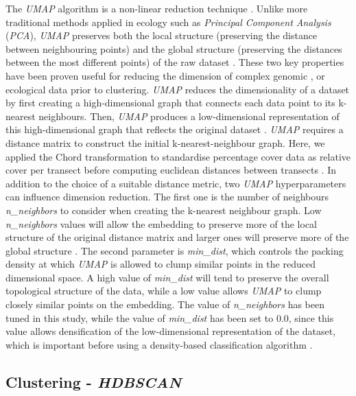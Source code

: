 \begin{refsection}
The \emph{UMAP} algorithm is a non-linear reduction technique
\autocite{McInnes_2020}. Unlike more traditional methods applied in
ecology such as \emph{Principal Component Analysis} (\emph{PCA}),
\emph{UMAP} preserves both the local structure (preserving the distance
between neighbouring points) and the global structure (preserving the
distances between the most different points) of the raw dataset
\autocite{McInnes_2020}. These two key properties have been proven
useful for reducing the dimension of complex genomic
\autocite{Dorrity_2020}, or ecological \autocite{Milosevic_2022} data
prior to clustering. \emph{UMAP} reduces the dimensionality of a dataset
by first creating a high-dimensional graph that connects each data point
to its k-nearest neighbours. Then, \emph{UMAP} produces a
low-dimensional representation of this high-dimensional graph that
reflects the original dataset \autocite{McInnes_2020}. \emph{UMAP}
requires a distance matrix to construct the initial k-nearest-neighbour
graph. Here, we applied the Chord transformation to standardise
percentage cover data as relative cover per transect before computing
euclidean distances between transects \autocite{Legendre_2001}. In
addition to the choice of a suitable distance metric, two \emph{UMAP}
hyperparameters can influence dimension reduction. The first one is the
number of neighbours \emph{n\_neighbors} to consider when creating the
k-nearest neighbour graph. Low \emph{n\_neighbors} values will allow the
embedding to preserve more of the local structure of the original
distance matrix and larger ones will preserve more of the global
structure \autocite{McInnes_2020}. The second parameter is
\emph{min\_dist}, which controls the packing density at which
\emph{UMAP} is allowed to clump similar points in the reduced
dimensional space. A high value of \emph{min\_dist} will tend to
preserve the overall topological structure of the data, while a low
value allows \emph{UMAP} to clump closely similar points on the
embedding. The value of \emph{n\_neighbors} has been tuned in this
study, while the value of \emph{min\_dist} has been set to 0.0, since
this value allows densification of the low-dimensional representation of
the dataset, which is important before using a density-based
classification algorithm \autocite{Vermeulen_2021}.

\hypertarget{clustering---hdbscan}{%
\subsection{\texorpdfstring{Clustering -
\emph{HDBSCAN}}{Clustering - HDBSCAN}}\label{clustering---hdbscan}}


\end{refsection}
